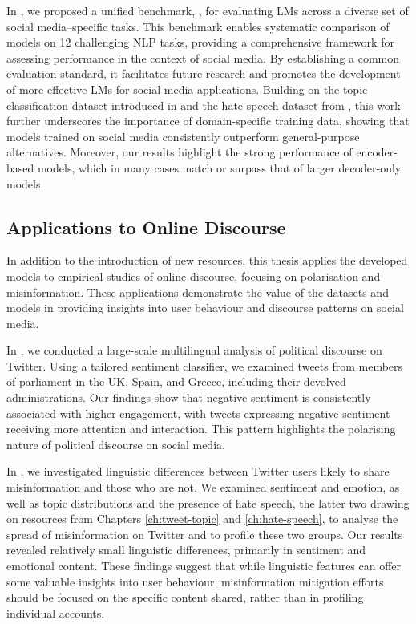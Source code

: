 In , we proposed a unified benchmark, {\DATASET}, for evaluating \acp{LM} across a diverse set of social media–specific tasks. This benchmark enables systematic comparison of models on 12 challenging \ac{NLP} tasks, providing a comprehensive framework for assessing performance in the context of social media. By establishing a common evaluation standard, it facilitates future research and promotes the development of more effective \acp{LM} for social media applications. Building on the topic classification dataset introduced in  and the hate speech dataset from , this work further underscores the importance of domain-specific training data, showing that models trained on social media consistently outperform general-purpose alternatives. Moreover, our results highlight the strong performance of encoder-based models, which in many cases match or surpass that of larger decoder-only models.

\subsection{Applications to Online Discourse }
In addition to the introduction of new resources, this thesis applies the developed models to empirical studies of online discourse, focusing on polarisation and misinformation. These applications demonstrate the value of the datasets and models in providing insights into user behaviour and discourse patterns on social media.

In , we conducted a large-scale multilingual analysis of political discourse on Twitter. Using a tailored sentiment classifier, we examined tweets from members of parliament in the UK, Spain, and Greece, including their devolved administrations. Our findings show that negative sentiment is consistently associated with higher engagement, with tweets expressing negative sentiment receiving more attention and interaction. This pattern highlights the polarising nature of political discourse on social media.


In , we investigated linguistic differences between Twitter users likely to share misinformation and those who are not. We examined sentiment and emotion, as well as topic distributions and the presence of hate speech, the latter two drawing on resources from Chapters \ref{ch:tweet-topic} and \ref{ch:hate-speech}, to analyse the spread of misinformation on Twitter and to profile these two groups. Our results revealed relatively small linguistic differences, primarily in sentiment and emotional content. These findings suggest that while linguistic features can offer some valuable insights into user behaviour, misinformation mitigation efforts should be focused on the specific content shared, rather than in profiling individual accounts.

